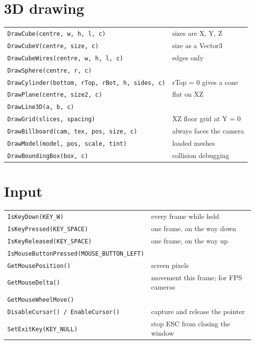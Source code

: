 \section{3D drawing}

\begin{center}
\begin{tabular}{@{}ll@{}}
\toprule
\lstinline|DrawCube(centre, w, h, l, c)| & sizes are X, Y, Z \\
\lstinline|DrawCubeV(centre, size, c)| & size as a Vector3 \\
\lstinline|DrawCubeWires(centre, w, h, l, c)| & edges only \\
\lstinline|DrawSphere(centre, r, c)| & \\
\lstinline|DrawCylinder(bottom, rTop, rBot, h, sides, c)| & rTop = 0 gives a cone \\
\lstinline|DrawPlane(centre, size2, c)| & flat on XZ \\
\lstinline|DrawLine3D(a, b, c)| & \\
\lstinline|DrawGrid(slices, spacing)| & XZ floor grid at Y = 0 \\
\lstinline|DrawBillboard(cam, tex, pos, size, c)| & always faces the camera \\
\lstinline|DrawModel(model, pos, scale, tint)| & loaded meshes \\
\lstinline|DrawBoundingBox(box, c)| & collision debugging \\
\bottomrule
\end{tabular}
\end{center}

\section{Input}

\begin{center}
\begin{tabular}{@{}ll@{}}
\toprule
\lstinline|IsKeyDown(KEY_W)| & every frame while held \\
\lstinline|IsKeyPressed(KEY_SPACE)| & one frame, on the way down \\
\lstinline|IsKeyReleased(KEY_SPACE)| & one frame, on the way up \\
\lstinline|IsMouseButtonPressed(MOUSE_BUTTON_LEFT)| & \\
\lstinline|GetMousePosition()| & screen pixels \\
\lstinline|GetMouseDelta()| & movement this frame; for FPS cameras \\
\lstinline|GetMouseWheelMove()| & \\
\lstinline|DisableCursor() / EnableCursor()| & capture and release the pointer \\
\lstinline|SetExitKey(KEY_NULL)| & stop ESC from closing the window \\
\bottomrule
\end{tabular}
\end{center}

